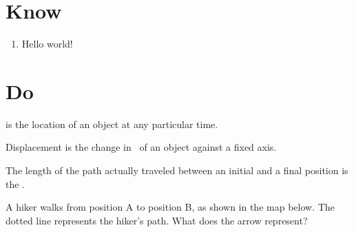 \documentclass[answers]{exam}
\begin{document}
\section*{Know}

\begin{multicols}{3}
\begin{enumerate}[itemsep=0pt]
    \item Hello world!
\end{enumerate}
\end{multicols}




\section*{Do}

\begin{questions}
\question 
\fillin[Position][3cm] is the location of an object at any particular time.

\question 
Displacement is the change in \fillin[position][3cm]\ of an object against a fixed axis.

\question
The length of the path actually traveled between an initial and a final position is the \fillin[distance][3cm].

\question
A hiker walks from position A to position B, as shown in the map below. The dotted line represents the hiker's path. What does the arrow represent? \fillin[displacement][3cm]

\begin{center}
\end{center}




\end{questions}
\end{document}
